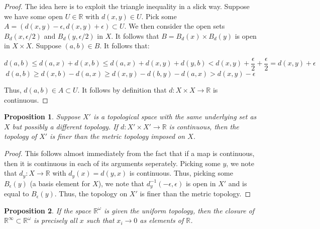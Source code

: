 \documentclass[10pt, oneside]{amsart}
\newtheorem{prop}{Proposition}
\begin{document}
    \begin{proof}
      The idea here is to exploit the triangle inequality in a slick way. Suppose we have some open $U \in \mathbb{R}$ with $d(x, y) \in U$. Pick some $A = \left( d(x, y) - \epsilon, d(x, y) + \epsilon \right) \subset U$.
      We then consider the open sets $B_{d}(x, \epsilon/2)$ and $B_{d}(y, \epsilon/2)$ in $X$. It follows that $B = B_{d}(x) \times B_d(y)$ is open in $X \times X$. Suppose $(a, b) \in B$. It follows that:

      $$d(a, b) \leq d(a, x) + d(x, b) \leq d(a, x) + d(x, y) + d(y, b) < d(x, y) + \frac{\epsilon}{2} + \frac{\epsilon}{2} = d(x, y) + \epsilon$$
      $$d(a, b) \geq d(x, b) - d(a, x) \geq d(x, y) - d(b, y) - d(a, x) > d(x, y) - \epsilon$$

      Thus, $d(a, b) \in A \subset U$. It follows by definition that $d : X \times X \rightarrow \mathbb{R}$ is continuous.
    \end{proof}

    \begin{prop}
      Suppose $X'$ is a topological space with the same underlying set as $X$ but possibly a different topology. If $d : X' \times X' \rightarrow \mathbb{R}$ is continuous, then the
      topology of $X'$ is finer than the metric topology imposed on $X$.
    \end{prop}

    \begin{proof}
      This follows almost immediately from the fact that if a map is continuous, then it is continuous in each of its arguments seperately. Picking some $y$, we note that $d_y : X \rightarrow \mathbb{R}$ with $d_y(x) = d(y, x)$ is
      continuous. Thus, picking some $B_{\epsilon}(y)$ (a basis element for $X$), we note that $d_y^{-1}(-\epsilon, \epsilon)$ is open in $X'$ and is equal to $B_{\epsilon}(y)$. Thus, the topology on $X'$ is finer than the metric topology.
    \end{proof}

    \begin{prop}
      If the space $\mathbb{R}^{\omega}$ is given the uniform topology, then the closure of $\mathbb{R}^{\infty} \subset \mathbb{R}^{\omega}$ is precisely all $x$ such that $x_i \rightarrow 0$ as
      elements of $\mathbb{R}$.
    \end{prop}
\end{document}

